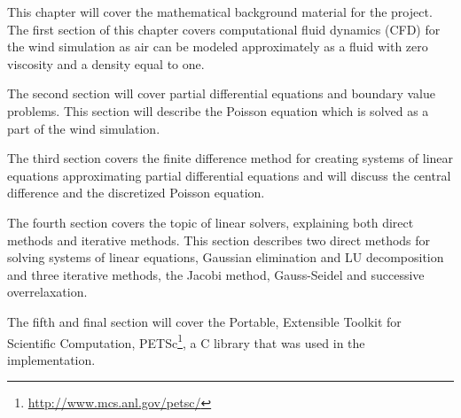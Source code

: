 This chapter will cover the mathematical background material for the project. 
The first section of this chapter covers computational fluid dynamics (CFD) 
for the wind simulation as air can be modeled approximately as a fluid with 
zero viscosity and a density equal to one\cite{originalSnowThesis}.

The second section will cover partial differential equations and boundary value
problems. This section will describe the Poisson equation which is solved as a 
part of the wind simulation.

The third section covers the finite difference method for creating systems of
linear equations approximating partial differential equations and will discuss
the central difference and the discretized Poisson equation.

The fourth section covers the topic of linear solvers, explaining both direct
methods and iterative methods. This section describes two direct
methods for solving systems of linear equations, Gaussian elimination and LU
decomposition and three iterative methods, the Jacobi method, Gauss-Seidel and
successive overrelaxation.

The fifth and final section will cover the Portable, Extensible Toolkit for
Scientific Computation, PETSc\footnote{\url{http://www.mcs.anl.gov/petsc/}}, a C library that was used in the implementation.
